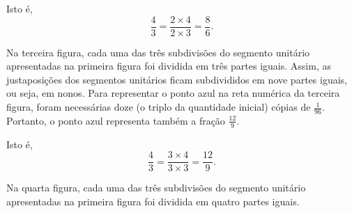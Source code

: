 \begin{refletindo*}
\begin{center}
\end{center}


Isto é,
$$\dfrac{4}{3} = \dfrac{2 \times 4}{2 \times 3} = \dfrac{8}{6}.$$

Na terceira figura, cada uma das três subdivisões do segmento unitário apresentadas na primeira figura foi dividida em três partes iguais. Assim, as justaposições dos segmentos unitários ficam subdivididos em nove partes iguais, ou seja, em nonos. Para representar o ponto azul na reta numérica da terceira figura, foram necessárias doze (o triplo da quantidade inicial) cópias de $\frac{1}{96}$. Portanto, o ponto azul representa também a fração $\frac{12}{9}$.

\begin{center}
\end{center}


Isto é, 
$$\dfrac{4}{3} = \dfrac{3 \times 4}{3 \times 3} = \dfrac{12}{9}.$$

Na quarta figura, cada uma das três subdivisões do segmento unitário apresentadas na primeira figura foi dividida em quatro partes iguais.


\end{refletindo*}
